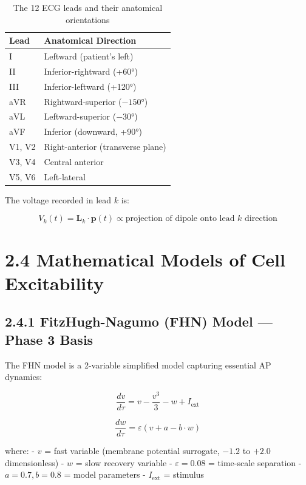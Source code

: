 \documentclass[12pt,oneside,a4paper]{book}
\begin{document}
\begin{table}[H]
\centering
\begin{tabularx}{\textwidth}{|l|X|}
\hline
\textbf{Lead} & \textbf{Anatomical Direction} \\
\hline
I & Leftward (patient's left) \\
II & Inferior-rightward (+60°) \\
III & Inferior-leftward (+120°) \\
aVR & Rightward-superior ($-150°$) \\
aVL & Leftward-superior ($-30°$) \\
aVF & Inferior (downward, +90°) \\
V1, V2 & Right-anterior (transverse plane) \\
V3, V4 & Central anterior \\
V5, V6 & Left-lateral \\
\hline
\end{tabularx}
\caption{The 12 ECG leads and their anatomical orientations}
\label{tab:lead_vectors}
\end{table}

The voltage recorded in lead $k$ is:

$$V_k(t) = \mathbf{L}_k \cdot \mathbf{p}(t) \propto \text{projection of dipole onto lead $k$ direction}$$

\section{2.4 Mathematical Models of Cell Excitability}

\subsection{2.4.1 FitzHugh-Nagumo (FHN) Model — Phase 3 Basis}

The FHN model is a 2-variable simplified model capturing essential AP dynamics:

\begin{equation}
\frac{dv}{d\tau} = v - \frac{v^3}{3} - w + I_{\text{ext}}
\end{equation}

\begin{equation}
\frac{dw}{d\tau} = \varepsilon (v + a - b \cdot w)
\end{equation}

where:
- $v$ = fast variable (membrane potential surrogate, $-1.2$ to $+2.0$ dimensionless)
- $w$ = slow recovery variable
- $\varepsilon = 0.08$ = time-scale separation
- $a = 0.7, b = 0.8$ = model parameters
- $I_{\text{ext}}$ = stimulus
\end{document}
